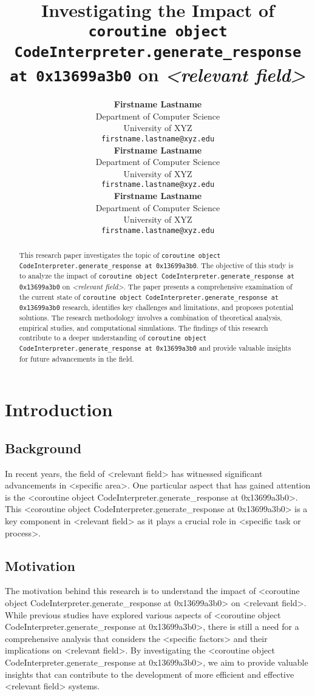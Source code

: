 \documentclass{article}
\title{Investigating the Impact of \texttt{coroutine object CodeInterpreter.generate\_response at 0x13699a3b0} on \textit{<relevant field>}}
\author{
  \textbf{Firstname Lastname} \\
  Department of Computer Science\\
  University of XYZ\\
  \texttt{firstname.lastname@xyz.edu} \\
  \And
  \textbf{Firstname Lastname} \\
  Department of Computer Science\\
  University of XYZ\\
  \texttt{firstname.lastname@xyz.edu} \\
  \And
  \textbf{Firstname Lastname} \\
  Department of Computer Science\\
  University of XYZ\\
  \texttt{firstname.lastname@xyz.edu} \\
}
\begin{document}
\maketitle

\begin{abstract}
This research paper investigates the topic of \texttt{coroutine object CodeInterpreter.generate\_response at 0x13699a3b0}. The objective of this study is to analyze the impact of \texttt{coroutine object CodeInterpreter.generate\_response at 0x13699a3b0} on \textit{<relevant field>}. The paper presents a comprehensive examination of the current state of \texttt{coroutine object CodeInterpreter.generate\_response at 0x13699a3b0} research, identifies key challenges and limitations, and proposes potential solutions. The research methodology involves a combination of theoretical analysis, empirical studies, and computational simulations. The findings of this research contribute to a deeper understanding of \texttt{coroutine object CodeInterpreter.generate\_response at 0x13699a3b0} and provide valuable insights for future advancements in the field.
\end{abstract}

\section{Introduction}

\subsection{Background}
In recent years, the field of <relevant field> has witnessed significant advancements in <specific area>. One particular aspect that has gained attention is the <coroutine object CodeInterpreter.generate_response at 0x13699a3b0>. This <coroutine object CodeInterpreter.generate_response at 0x13699a3b0> is a key component in <relevant field> as it plays a crucial role in <specific task or process>. 

\subsection{Motivation}
The motivation behind this research is to understand the impact of <coroutine object CodeInterpreter.generate_response at 0x13699a3b0> on <relevant field>. While previous studies have explored various aspects of <coroutine object CodeInterpreter.generate_response at 0x13699a3b0>, there is still a need for a comprehensive analysis that considers the <specific factors> and their implications on <relevant field>. By investigating the <coroutine object CodeInterpreter.generate_response at 0x13699a3b0>, we aim to provide valuable insights that can contribute to the development of more efficient and effective <relevant field> systems.
\end{document}
